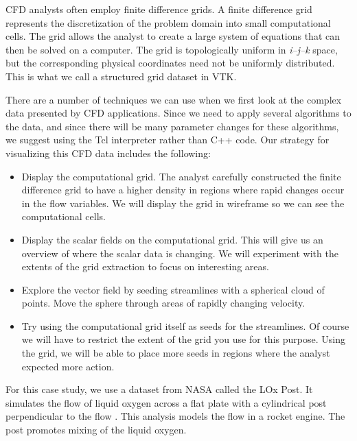 CFD analysts often employ finite difference grids. A finite difference grid represents the discretization of the problem domain into small computational cells. The grid allows the analyst to create a large system of equations that can then be solved on a computer.
The grid is topologically uniform in \emph{i--j--k} space, but the corresponding physical coordinates need not be uniformly distributed. This is what we call a structured grid dataset in VTK.

There are a number of techniques we can use when we first look at the complex data presented by CFD applications. Since we need to apply several algorithms to the data, and since there will be many parameter changes for these algorithms, we suggest using the Tcl interpreter rather than C++ code. Our strategy for visualizing this CFD data includes the following:

\begin{itemize}

    \item Display the computational grid. The analyst carefully constructed the finite difference grid to have a higher density in regions where rapid changes occur in the flow variables. We will display the grid in wireframe so we can see the computational cells.

    \item Display the scalar fields on the computational grid. This will give us an overview of where the scalar data is changing. We will experiment with the extents of the grid extraction to focus on interesting areas.

    \item Explore the vector field by seeding streamlines with a spherical cloud of points. Move the sphere through areas of rapidly changing velocity.

    \item Try using the computational grid itself as seeds for the streamlines. Of course we will have to restrict the extent of the grid you use for this purpose. Using the grid, we will be able to place more seeds in regions where the analyst expected more action.

\end{itemize}

For this case study, we use a dataset from NASA called the LOx Post. It simulates the flow of liquid oxygen across a flat plate with a cylindrical post perpendicular to the flow \cite{Rogers86}. This analysis models the flow in a rocket engine. The post promotes mixing of the liquid oxygen.

